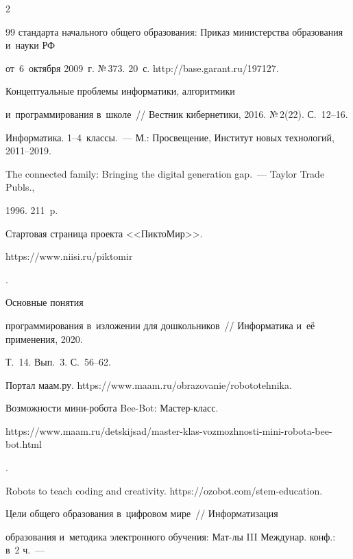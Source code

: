\begin{multicols}{2}
{{\begin{thebibliography}{99}
стандарта начального общего образования: Приказ министерства образования и~науки РФ 


от~6~октября 2009~г. №\,373. 20~с. {\sf http://base.garant.ru/197127}.




   Концептуальные проблемы информатики, алгоритмики 


  и~программирования в~школе~// Вестник кибернетики, 2016. №\,2(22). С.~12--16.




   Информатика. 1--4~классы.~--- М.: Просвещение, Институт новых технологий, 2011--2019.




   The connected family: Bringing the digital generation gap.~--- Taylor Trade Publs., 


1996. 211~p.




  Стартовая страница проекта <<ПиктоМир>>. {\sf 


https://www.niisi.ru/piktomir}.




   Основные понятия 


программирования в~изложении для дошкольников~// Информатика и~её применения, 2020. 


Т.~14. Вып.~3. С.~56--62.




  Портал маам.ру. {\sf https://www.maam.ru/obrazovanie/\linebreak robototehnika}.




  Возможности мини-робота Bee-Bot: Мастер-класс. {\sf  


  https://www.maam.ru/detskijsad/master-klas-vozmozhnosti-mini-robota-bee-bot.html}.




  Robots to teach coding and creativity. {\sf https://\linebreak ozobot.com/stem-education}.




   Цели общего образования в~цифровом мире~// Информатизация 


образования и~методика электронного обучения: Мат-лы III Междунар. конф.: в~2 ч.~--- 



\end{thebibliography}}}
\end{multicols}
